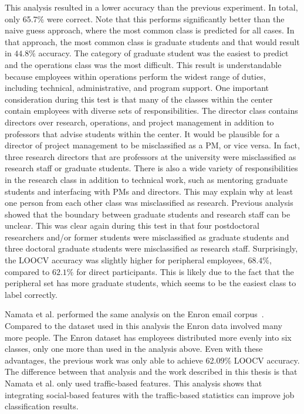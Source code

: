 \documentclass[12pt]{report}
\begin{document}
This analysis resulted in a lower accuracy than the previous experiment.
In total, only 65.7\% were correct.
Note that this performs significantly better than the naive guess approach, where the most common class is predicted for all cases.
In that approach, the most common class is graduate students and that would result in $44.8\%$ accuracy.
The category of graduate student was the easiest to predict and the operations class was the most difficult.
This result is understandable because employees within operations perform the widest range of duties, including technical, administrative, and program support.
One important consideration during this test is that many of the classes within the center contain employees with diverse sets of responsibilities.
The director class contains directors over research, operations, and project management in addition to professors that advise students within the center.
It would be plausible for a director of project management to be misclassified as a PM, or vice versa.
In fact, three research directors that are professors at the university were misclassified as research staff or graduate students.
There is also a wide variety of responsibilities in the research class in addition to technical work, such as mentoring graduate students and interfacing with PMs and directors.
This may explain why at least one person from each other class was misclassified as research.
Previous analysis showed that the boundary between graduate students and research staff can be unclear.
This was clear again during this test in that four postdoctoral researchers and/or former students were misclassified as graduate students and three doctoral graduate students were misclassified as research staff.
Surprisingly, the LOOCV accuracy was slightly higher for peripheral employees, $68.4\%$, compared to $62.1\%$ for direct participants.
This is likely due to the fact that the peripheral set has more graduate students, which seems to be the easiest class to label correctly.

Namata et al. performed the same analysis on the Enron email corpus~\cite{namata_inferring_2006}.
Compared to the dataset used in this analysis the Enron data involved many more people.
The Enron dataset has employees distributed more evenly into six classes, only one more than used in the analysis above.
Even with these advantages, the previous work was only able to achieve 62.09\% LOOCV accuracy.
The difference between that analysis and the work described in this thesis is that Namata et al. only used traffic-based features.
This analysis shows that integrating social-based features with the traffic-based statistics can improve job classification results.
\end{document}
